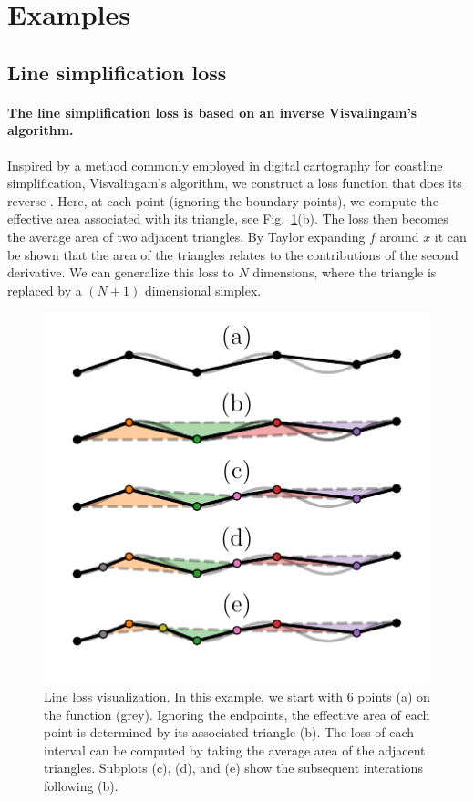 \documentclass[english, twocolumn, 10pt, aps, superscriptaddress, floatfix, prb, citeautoscript]{revtex4-1}
\renewcommand{\citep}{\cite}
\begin{document}
\hypertarget{examples}{%
\section{Examples}\label{examples}}

\hypertarget{line-simplification-loss}{%
\subsection{Line simplification loss}\label{line-simplification-loss}}

\hypertarget{the-line-simplification-loss-is-based-on-an-inverse-visvalingams-algorithm.}{%
\paragraph{The line simplification loss is based on an inverse Visvalingam's algorithm.}\label{the-line-simplification-loss-is-based-on-an-inverse-visvalingams-algorithm.}}

Inspired by a method commonly employed in digital cartography for coastline simplification, Visvalingam's algorithm, we construct a loss function that does its reverse \citep{Visvalingam1990}.
Here, at each point (ignoring the boundary points), we compute the effective area associated with its triangle, see Fig.~\ref{fig:line_loss}(b).
The loss then becomes the average area of two adjacent triangles.
By Taylor expanding \(f\) around \(x\) it can be shown that the area of the triangles relates to the contributions of the second derivative.
We can generalize this loss to \(N\) dimensions, where the triangle is replaced by a \((N+1)\) dimensional simplex.

\begin{figure}
\hypertarget{fig:line_loss}{%
\centering
\includegraphics{figures/line_loss.pdf}
\caption{Line loss visualization.
In this example, we start with 6 points (a) on the function (grey).
Ignoring the endpoints, the effective area of each point is determined by its associated triangle (b).
The loss of each interval can be computed by taking the average area of the adjacent triangles.
Subplots (c), (d), and (e) show the subsequent interations following (b).}\label{fig:line_loss}
}
\end{figure}
\end{document}
